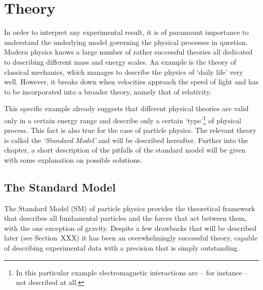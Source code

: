 \chapter{Theory}
\label{ch:theory}
In order to interpret any experimental result, it is of paramount importance to understand
the underlying model governing the physical processes in question. Modern physics knows a
large number of rather successful theories all dedicated to describing different mass and 
energy scales. An example is the theory of classical mechanics, which manages to describe the 
physics of `daily life' very well. However, it breaks down when velocities approach
the speed of light and has to be incorporated into a broader theory, namely that of relativity.

This specific example already suggests that different physical theories are valid only in a 
certain energy range and describe only a certain `type'\footnote{In this particular example
electromagnetic interactions are -- for instance -- not described at all.} of physical process. 
This fact is also true for the case of particle physics. The relevant theory is called the 
\textit{`Standard Model'} and will be described hereafter. Further into the chapter,
a short description of the pitfalls of the standard model will be given with some explanation
on possible solutions.

\section{The Standard Model}
\label{sec:standardmodel}
The Standard Model (SM) of particle physics provides the theoretical framework that
describes all fundamental particles and the forces that act between them, with the one
exception of gravity. Despite a few drawbacks that will be described later (see Section~XXX)
it has been an overwhelmingly successful theory, capable of describing experimental data
with a precision that is simply outstanding.


